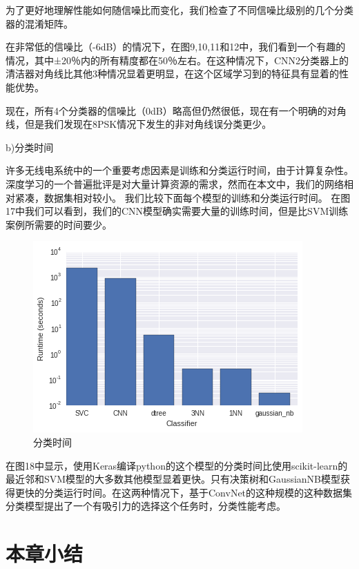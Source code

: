 为了更好地理解性能如何随信噪比而变化，我们检查了不同信噪比级别的几个分类器的混淆矩阵。\par

在非常低的信噪比（-6dB）的情况下，在图9,10,11和12中，我们看到一个有趣的情况，其中±20％内的所有精度都在50％左右。在这种情况下，CNN2分类器上的清洁器对角线比其他3种情况显着更明显，在这个区域学习到的特征具有显着的性能优势。\par

现在，所有4个分类器的信噪比（0dB）略高但仍然很低，现在有一个明确的对角线，但是我们发现在8PSK情况下发生的非对角线误分类更少。\par

b)分类时间

许多无线电系统中的一个重要考虑因素是训练和分类运行时间，由于计算复杂性。 深度学习的一个普遍批评是对大量计算资源的需求，然而在本文中，我们的网络相对紧凑，数据集相对较小。 我们比较下面每个模型的训练和分类运行时间。 在图17中我们可以看到，我们的CNN模型确实需要大量的训练时间，但是比SVM训练案例所需要的时间要少。\par
\begin{figure}[!h]
	\centering
	\includegraphics[scale=0.5]{figures/chapter_3/train_time}
	\caption{分类时间}	\label{fig_3_2}
\end{figure}

在图18中显示，使用Keras编译python的这个模型的分类时间比使用scikit-learn的最近邻和SVM模型的大多数其他模型显着更快。只有决策树和GaussianNB模型获得更快的分类运行时间。在这两种情况下，基于ConvNet的这种规模的这种数据集分类模型提出了一个有吸引力的选择这个任务时，分类性能考虑。\par


\section{本章小结}

